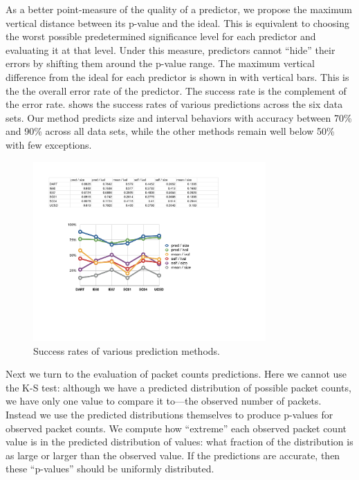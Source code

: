 \documentclass{acm_proc_article-sp}
\begin{document}
As a better point-measure of the quality of a predictor, we propose the maximum vertical distance between its p-value  and the ideal.
This is equivalent to choosing the worst possible predetermined significance level for each predictor and evaluating it at that level.
Under this measure, predictors cannot ``hide'' their errors by shifting them around the p-value range.
The maximum vertical difference from the ideal for each predictor is shown in  with vertical bars.
This is the the overall error rate of the predictor.
The success rate is the complement of the error rate.
 shows the success rates of various predictions across the six data sets.
Our method predicts size and interval behaviors with accuracy between 70\% and 90\% across all data sets, while the other methods remain well below 50\% with few exceptions.

\begin{figure}[b]
\vspace{-1em}
\begin{center}
\includegraphics[width=3.5in]{pred_stats}
\caption{Success rates of various prediction methods.}
\end{center}
\vspace{-0.9em}
\end{figure}

Next we turn to the evaluation of packet counts predictions.
Here we cannot use the K-S test:
although we have a predicted distribution of possible packet counts, we have only one value to compare it to---the observed number of packets.
Instead we use the predicted distributions themselves to produce p-values for observed packet counts.
We compute how ``extreme'' each observed packet count value is in the predicted distribution of values:
what fraction of the distribution is as large or larger than the observed value.
If the predictions are accurate, then these ``p-values'' should be uniformly distributed.
\end{document}
